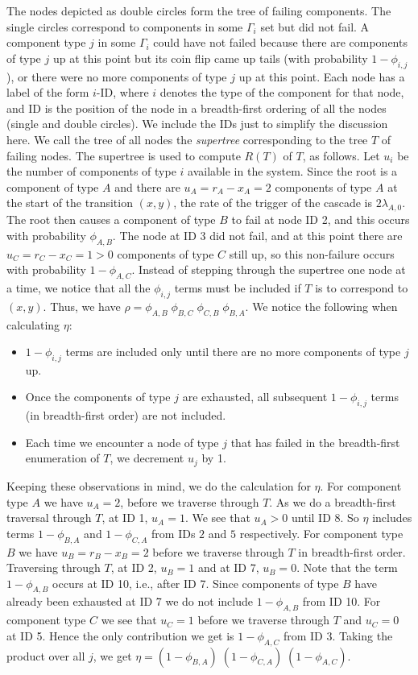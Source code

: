 \documentclass[12pt]{article}
\begin{document}
The nodes depicted as double circles form the tree of failing components. The single circles correspond to components in some $\Gamma_i$ set but did not fail.  A component type $j$ in some $\Gamma_i$ could have not failed because there are components of type $j$ up at this point but its coin flip came up tails  (with probability $1 - \phi_{i, j}$), or there were no more components of type $j$ up at this point. Each node has a label of the form $i$-ID, where $i$ denotes the type of the component for that node, and ID is the position of the node in a breadth-first ordering of all the nodes (single and double circles). We include the IDs just to simplify the discussion here. We call the tree of all nodes the \textit{supertree} corresponding to the tree $T$ of failing nodes. The supertree is used to compute $R(T)$ of $T$, as follows. Let $u_i$ be the number of components of type $i$ available in the system. Since the root is a component of type $A$ and there are $u_A = r_A - x_A = 2$ components of type $A$ at the start of the transition $(x, y)$, the rate of the trigger of the cascade is $2 \lambda_{A, 0}$. The root then causes a component of type $B$ to fail at node ID 2, and this occurs with probability $\phi_{A, B}$. The node at ID 3 did not fail, and at this point there are $u_C = r_C - x_C = 1 > 0$ components of type $C$ still up, so this non-failure occurs with probability $1 - \phi_{A,C}$. Instead of stepping through the supertree one node at a time, we notice that all the $\phi_{i, j}$ terms must be included if $T$ is to correspond to $(x, y)$. Thus, we have $\rho = \phi_{A, B} \; \phi_{B, C} \; \phi_{C, B} \; \phi_{B, A}$. We notice the following when calculating $\eta$: \begin{itemize} \item $1 - \phi_{i, j}$ terms are included only until there are no more components of type $j$ up. \item Once the components of type $j$ are exhausted, all subsequent $1 - \phi_{i, j}$ terms (in breadth-first order) are not included. \item Each time we encounter a node of type $j$ that has failed in the breadth-first enumeration of $T$, we decrement $u_j$ by 1. \end{itemize} Keeping these observations in mind, we do the calculation for $\eta$. For component type $A$ we have $u_A = 2$, before we traverse through $T$. As we do a breadth-first traversal through $T$, at ID 1, $u_A = 1$. We see that $u_A > 0$ until ID 8. So $\eta$ includes terms $1 - \phi_{B, A}$ and $1 - \phi_{C, A}$ from IDs $2$ and $5$ respectively. For component type $B$ we have $u_B = r_B - x_B  = 2$ before we traverse through $T$ in breadth-first order. Traversing through $T$, at ID 2, $u_B = 1$ and at ID 7, $u_B = 0$. Note that the term $1 - \phi_{A, B}$ occurs at ID 10, i.e., after ID 7. Since components of type $B$ have already been exhausted at ID 7 we do not include $1 - \phi_{A, B}$ from ID 10. For component type $C$ we see that $u_C = 1$ before we traverse through $T$ and $u_C = 0$ at ID 5. Hence the only contribution we get is $1 - \phi_{A, C}$ from ID 3. Taking the product over all $j$, we get $\eta = (1 - \phi_{B, A}) \; (1 - \phi_{C, A}) \; (1 - \phi_{A,C})$. 
\end{document}
